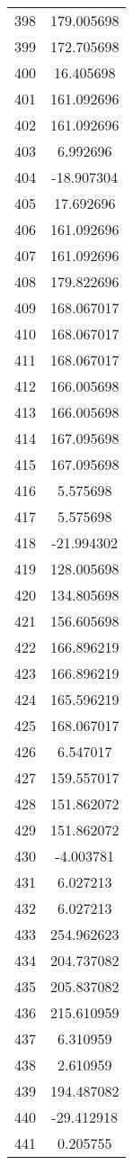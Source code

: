 \documentclass[12pt]{article}
\begin{document}
\begin{longtable}{@{}cc@{}}
398 & 179.005698 \\
399 & 172.705698 \\
400 & 16.405698 \\
401 & 161.092696 \\
402 & 161.092696 \\
403 & 6.992696 \\
404 & -18.907304 \\
405 & 17.692696 \\
406 & 161.092696 \\
407 & 161.092696 \\
408 & 179.822696 \\
409 & 168.067017 \\
410 & 168.067017 \\
411 & 168.067017 \\
412 & 166.005698 \\
413 & 166.005698 \\
414 & 167.095698 \\
415 & 167.095698 \\
416 & 5.575698 \\
417 & 5.575698 \\
418 & -21.994302 \\
419 & 128.005698 \\
420 & 134.805698 \\
421 & 156.605698 \\
422 & 166.896219 \\
423 & 166.896219 \\
424 & 165.596219 \\
425 & 168.067017 \\
426 & 6.547017 \\
427 & 159.557017 \\
428 & 151.862072 \\
429 & 151.862072 \\
430 & -4.003781 \\
431 & 6.027213 \\
432 & 6.027213 \\
433 & 254.962623 \\
434 & 204.737082 \\
435 & 205.837082 \\
436 & 215.610959 \\
437 & 6.310959 \\
438 & 2.610959 \\
439 & 194.487082 \\
440 & -29.412918 \\
441 & 0.205755 \\

\end{longtable}
\end{document}

